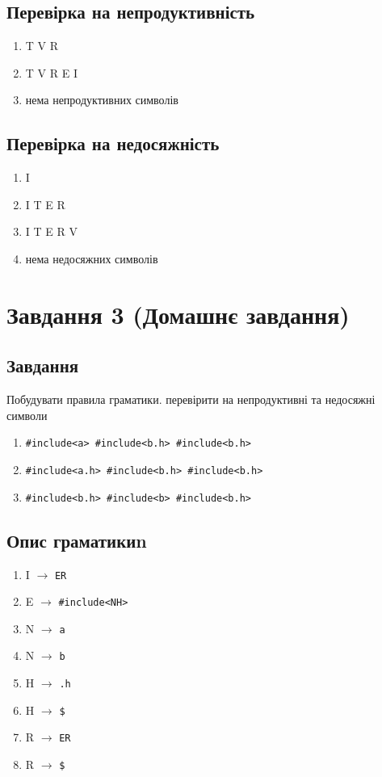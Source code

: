 \subsection{Перевірка на непродуктивність}
\begin{enumerate}
    \item  T V R
    \item  T V R E I
    \item  нема непродуктивних символів
\end{enumerate}

\subsection{Перевірка на недосяжність}
\begin{enumerate}
    \item  I
    \item  I T E R
    \item  I T E R V
    \item  нема недосяжних символів
\end{enumerate}




\newpage
\section{Завдання 3 (Домашнє завдання)}
\subsection{Завдання}
Побудувати правила граматики. перевірити на непродуктивні та недосяжні символи
\begin{enumerate}
    \item \verb|#include<a> #include<b.h> #include<b.h>|
    \item \verb|#include<a.h> #include<b.h> #include<b.h>|
    \item \verb|#include<b.h> #include<b> #include<b.h>|
\end{enumerate}

\subsection{Опис граматикиn}
\begin{enumerate}
    \item  I $\to$ \verb|ER|
    \item  E $\to$ \verb|#include<NH>|
    \item  N $\to$ \verb|a|
    \item  N $\to$ \verb|b|
    \item  H $\to$ \verb|.h|
    \item  H $\to$ \verb|$|
    \item  R $\to$ \verb|ER|
    \item  R $\to$ \verb|$|
\end{enumerate}


